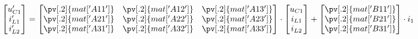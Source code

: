 \begin{equation}
    \begin{bmatrix}
        u_{C1}' \\
        i_{L1}' \\
        i_{L2}'
    \end{bmatrix}
    =
    \begin{bmatrix}
        \pv[.2]{mat['A11']} & \pv[.2]{mat['A12']} & \pv[.2]{mat['A13']} \\
        \pv[.2]{mat['A21']} & \pv[.2]{mat['A22']} & \pv[.2]{mat['A23']} \\
        \pv[.2]{mat['A31']} & \pv[.2]{mat['A32']} & \pv[.2]{mat['A33']}
    \end{bmatrix}
    \cdot
    \begin{bmatrix}
        u_{C1} \\
        i_{L1} \\
        i_{L2}
    \end{bmatrix}
    +
    \begin{bmatrix}
        \pv[.2]{mat['B11']} \\
        \pv[.2]{mat['B21']} \\
        \pv[.2]{mat['B31']}
    \end{bmatrix}
    \cdot
    i_1
    \label{form:uravn_sost_matrix}
\end{equation}